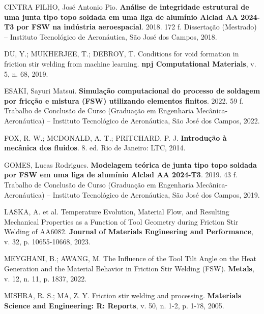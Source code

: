 \documentclass[12pt,openany]{report}
\begin{document}
\begin{singlespace}
CINTRA FILHO, José Antonio Pio. \textbf{Análise de integridade estrutural de uma junta tipo topo soldada em uma liga de alumínio Alclad AA 2024-T3 por FSW na indústria aeroespacial}. 2018. 172 f. Dissertação (Mestrado) -- Instituto Tecnológico de Aeronáutica, São José dos Campos, 2018.

DU, Y.; MUKHERJEE, T.; DEBROY, T. Conditions for void formation in friction stir welding from machine learning. \textbf{npj Computational Materials}, v. 5, n. 68, 2019.

ESAKI, Sayuri Matsui. \textbf{Simulação computacional do processo de soldagem por fricção e mistura (FSW) utilizando elementos finitos}. 2022. 59 f. Trabalho de Conclusão de Curso (Graduação em Engenharia Mecânica-Aeronáutica) -- Instituto Tecnológico de Aeronáutica, São José dos Campos, 2022.

FOX, R. W.; MCDONALD, A. T.; PRITCHARD, P. J. \textbf{Introdução à mecânica dos fluidos}. 8. ed. Rio de Janeiro: LTC, 2014.

GOMES, Lucas Rodrigues. \textbf{Modelagem teórica de junta tipo topo soldada por FSW em uma liga de alumínio Alclad AA 2024-T3}. 2019. 43 f. Trabalho de Conclusão de Curso (Graduação em Engenharia Mecânica-Aeronáutica) -- Instituto Tecnológico de Aeronáutica, São José dos Campos, 2019.

LASKA, A. et al. Temperature Evolution, Material Flow, and Resulting Mechanical Properties as a Function of Tool Geometry during Friction Stir Welding of AA6082. \textbf{Journal of Materials Engineering and Performance}, v. 32, p. 10655-10668, 2023.

MEYGHANI, B.; AWANG, M. The Influence of the Tool Tilt Angle on the Heat Generation and the Material Behavior in Friction Stir Welding (FSW). \textbf{Metals}, v. 12, n. 11, p. 1837, 2022.

MISHRA, R. S.; MA, Z. Y. Friction stir welding and processing. \textbf{Materials Science and Engineering: R: Reports}, v. 50, n. 1-2, p. 1-78, 2005.
\end{singlespace}
\end{document}
